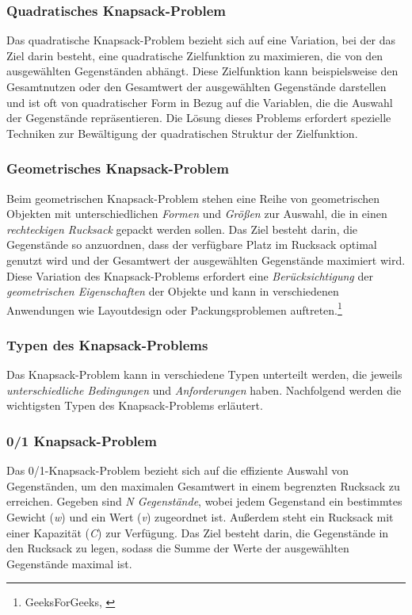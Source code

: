 \subsubsection*{Quadratisches Knapsack-Problem}
Das quadratische Knapsack-Problem bezieht sich auf eine Variation, bei der das Ziel darin besteht, eine quadratische
Zielfunktion zu maximieren, die von den ausgewählten Gegenständen abhängt. Diese Zielfunktion kann beispielsweise den
Gesamtnutzen oder den Gesamtwert der ausgewählten Gegenstände darstellen und ist oft von quadratischer Form in Bezug auf
die Variablen, die die Auswahl der Gegenstände repräsentieren. Die Lösung dieses Problems erfordert spezielle Techniken
zur Bewältigung der quadratischen Struktur der Zielfunktion.

\subsubsection*{Geometrisches Knapsack-Problem}
Beim geometrischen Knapsack-Problem stehen eine Reihe von geometrischen Objekten mit unterschiedlichen \textit{Formen}
und \textit{Größen} zur Auswahl, die in einen \textit{rechteckigen Rucksack} gepackt werden sollen. Das Ziel besteht darin,
die Gegenstände so anzuordnen, dass der verfügbare Platz im Rucksack optimal genutzt wird und der Gesamtwert der
ausgewählten Gegenstände maximiert wird. Diese Variation des Knapsack-Problems erfordert eine \textit{Berücksichtigung}
der \textit{geometrischen Eigenschaften} der Objekte und kann in verschiedenen Anwendungen wie Layoutdesign oder Packungsproblemen
auftreten.\footnote{GeeksForGeeks, \cite{Introduction to Knapsack Problem, its Types and How to solve them}}

\subsubsection{Typen des Knapsack-Problems}
Das Knapsack-Problem kann in verschiedene Typen unterteilt werden, die jeweils \textit{unterschiedliche Bedingungen} und
\textit{Anforderungen} haben. Nachfolgend werden die wichtigsten Typen des Knapsack-Problems erläutert.

\subsubsection*{0/1 Knapsack-Problem}
Das 0/1-Knapsack-Problem bezieht sich auf die effiziente Auswahl von Gegenständen, um den maximalen Gesamtwert in einem
begrenzten Rucksack zu erreichen. Gegeben sind \textit{N Gegenstände}, wobei jedem Gegenstand ein bestimmtes Gewicht
(\textit{w}) und ein Wert (\textit{v}) zugeordnet ist. Außerdem steht ein Rucksack mit einer Kapazität (\textit{C}) zur
Verfügung. Das Ziel besteht darin, die Gegenstände in den Rucksack zu legen, sodass die Summe der Werte der ausgewählten
Gegenstände maximal ist.

